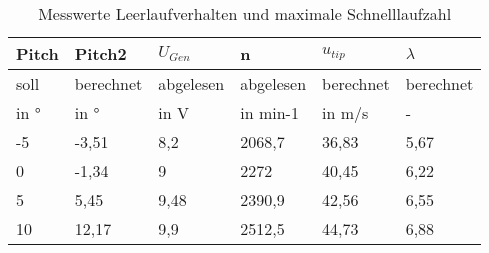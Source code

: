 \begin{table}[H]
    \centering
    \caption{Messwerte Leerlaufverhalten und maximale Schnelllaufzahl}
    \label{tab_Messwerte_Leerlaufverhalten}
    \begin{tabular}{|l|l|l|l|l|l|}
    \hline
    \rowcolor[HTML]{70AD47} 
    {\color[HTML]{FFFFFF} \textbf{Pitch}} & {\color[HTML]{FFFFFF} \textbf{Pitch2}} & {\color[HTML]{FFFFFF} \textbf{$U_{Gen}$}} & {\color[HTML]{FFFFFF} \textbf{n}} & {\color[HTML]{FFFFFF} \textbf{$u_{tip}$}} & {\color[HTML]{FFFFFF} \textbf{$\lambda$}} \\ \hline
    \rowcolor[HTML]{70AD47} 
    soll                                  & berechnet                              & abgelesen                                          & abgelesen                                & berechnet                                            & berechnet                                      \\ \hline
    \rowcolor[HTML]{70AD47} 
    in °                                  & in °                                   & in V                                               & in min-1                                 & in m/s                                               & -                                              \\ \hline
    \rowcolor[HTML]{C6E0B4} 
    -5                                    & -3,51                                  & 8,2                                                & 2068,7                                   & 36,83                                          & 5,67                                    \\ \hline
    \rowcolor[HTML]{E2EFDA} 
    0                                     & -1,34                                  & 9                                                  & 2272                                     & 40,45                                          & 6,22                                    \\ \hline
    \rowcolor[HTML]{C6E0B4} 
    5                                     & 5,45                                   & 9,48                                               & 2390,9                                   & 42,56                                          & 6,55                                    \\ \hline
    \rowcolor[HTML]{E2EFDA} 
    10                                    & 12,17                                  & 9,9                                                & 2512,5                                   & 44,73                                          & 6,88                                    \\ \hline

\end{tabular}
\end{table}
